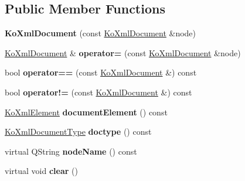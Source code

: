 \subsection*{Public Member Functions}
\begin{CompactItemize}
\item 
\hypertarget{classKoXmlDocument_25098f08f373e4b0ac8115279eb65c8b}{
\textbf{KoXmlDocument} (const \hyperlink{classKoXmlDocument}{KoXmlDocument} \&node)}
\label{classKoXmlDocument_25098f08f373e4b0ac8115279eb65c8b}

\item 
\hypertarget{classKoXmlDocument_ae3cf314dc2212a6930689a565e9b674}{
\hyperlink{classKoXmlDocument}{KoXmlDocument} \& \textbf{operator=} (const \hyperlink{classKoXmlDocument}{KoXmlDocument} \&node)}
\label{classKoXmlDocument_ae3cf314dc2212a6930689a565e9b674}

\item 
\hypertarget{classKoXmlDocument_94a468069c36d6bb136fe5aa0cf850f1}{
bool \textbf{operator==} (const \hyperlink{classKoXmlDocument}{KoXmlDocument} \&) const }
\label{classKoXmlDocument_94a468069c36d6bb136fe5aa0cf850f1}

\item 
\hypertarget{classKoXmlDocument_4f791e9965cdf7098c7aa50e40b0bb43}{
bool \textbf{operator!=} (const \hyperlink{classKoXmlDocument}{KoXmlDocument} \&) const }
\label{classKoXmlDocument_4f791e9965cdf7098c7aa50e40b0bb43}

\item 
\hypertarget{classKoXmlDocument_1f15d923c78de93d044de05097f9bdcb}{
\hyperlink{classKoXmlElement}{KoXmlElement} \textbf{documentElement} () const }
\label{classKoXmlDocument_1f15d923c78de93d044de05097f9bdcb}

\item 
\hypertarget{classKoXmlDocument_6266b024d223083496a47251012787c2}{
\hyperlink{classKoXmlDocumentType}{KoXmlDocumentType} \textbf{doctype} () const }
\label{classKoXmlDocument_6266b024d223083496a47251012787c2}

\item 
\hypertarget{classKoXmlDocument_8e6196e9bfc792164d8c481bb7f11fcd}{
virtual QString \textbf{nodeName} () const }
\label{classKoXmlDocument_8e6196e9bfc792164d8c481bb7f11fcd}

\item 
\hypertarget{classKoXmlDocument_5291c35721c45c0109176d9db6162fee}{
virtual void \textbf{clear} ()}
\label{classKoXmlDocument_5291c35721c45c0109176d9db6162fee}


\end{CompactItemize}
